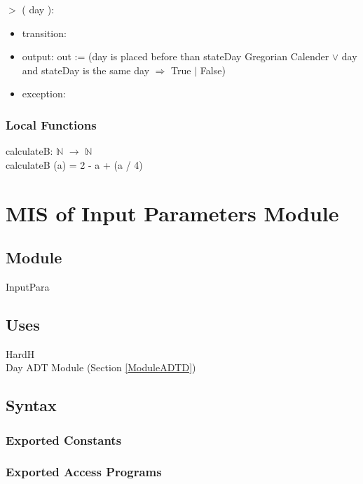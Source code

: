 \documentclass[12pt, titlepage]{article}
\begin{document}
\noindent $>$  ( day ):
\begin{itemize}
\item transition: 
\item output: out := (day is placed before than stateDay Gregorian Calender $\lor	$ day and stateDay is the same day $\Rightarrow$ True $|$ False)
\item exception:
\end{itemize}

\subsubsection{Local Functions}

calculateB: $\mathbb{N}$ $\rightarrow $ $\mathbb{N}$\\
calculateB (a) = 2 - a + (a / 4)\\



\section{MIS of Input Parameters Module} \label{ModuleIP} 

\subsection{Module}
InputPara

\subsection{Uses}
HardH\\
Day ADT Module (Section \ref{ModuleADTD})

\subsection{Syntax}

\subsubsection{Exported Constants}


\subsubsection{Exported Access Programs}
\end{document}
